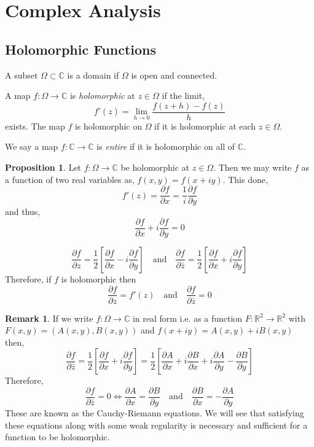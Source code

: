 \documentclass{article}
\newcommand{\R}{\mathbb{R}}
\newcommand{\C}{\mathbb{C}}
\newcommand{\pderiv}[2]{\frac{\partial{#1}}{\partial{#2}}}
\theoremstyle{definition}
\newtheorem{proposition}[theorem]{Proposition}
\newtheorem{remark}{Remark}[section]
\newenvironment{definition}[1][Definition:]{\begin{trivlist}
\item[\hskip \labelsep {\bfseries #1}]}{\end{trivlist}}
\begin{document}
\section{Complex Analysis}

\subsection{Holomorphic Functions}

\begin{definition}
A subset $\Omega \subset \C$ is a domain if $\Omega$ is open and connected.
\end{definition}

\begin{definition}
A map $f : \Omega \to \C$ is \textit{holomorphic} at $z \in \Omega$ if the limit,
\[ f'(z) = \lim_{h \to 0} \frac{ f(z + h) - f(z) }{h} \]
exists. The map $f$ is holomorphic on $\Omega$ if it is holomorphic at each $z \in \Omega$. 
\end{definition}

\begin{definition}
We say a map $f : \C \to \C$ is \textit{entire} if it is holomorphic on all of $\C$.
\end{definition}

\begin{proposition}
Let $f : \Omega \to \C$ be holomorphic at $z \in \Omega$. Then we may write $f$ as a function of two real variables as, $f(x, y) = f(x + i y)$. This done,
\[ f'(z) = \pderiv{f}{x} = \frac{1}{i} \pderiv{f}{y} \]
and thus,
\[ \pderiv{f}{x} + i \pderiv{f}{y} = 0 \] 
\end{proposition}


\begin{definition}
\[ \pderiv{f}{z} = \frac{1}{2} \left[ \pderiv{f}{x} - i \pderiv{f}{y} \right] \quad \text{and} \quad \pderiv{f}{\bar{z}} = \frac{1}{2} \left[ \pderiv{f}{x} + i \pderiv{f}{y} \right] \]
Therefore, if $f$ is holomorphic then 
\[ \pderiv{f}{z} = f'(z) \quad \text{and} \quad \pderiv{f}{\bar{z}} = 0 \]
\end{definition}


\begin{remark}
If we write $f : \Omega \to \C$ in real form i.e. as a function $F : \R^2 \to \R^2$ with $F(x,y) = (A(x,y), B(x,y))$ and $f(x + iy) = A(x,y) + i B(x,y)$ then,
\[ \pderiv{f}{\bar{z}} = \frac{1}{2} \left[ \pderiv{f}{x} + i \pderiv{f}{y} \right] = \frac{1}{2} \left[ \pderiv{A}{x} + i \pderiv{B}{x} + i \pderiv{A}{y} - \pderiv{B}{y} \right] \]
Therefore,
\[ \pderiv{f}{\bar{z}} = 0 \iff \pderiv{A}{x} = \pderiv{B}{y} \quad \text{and} \quad \pderiv{B}{x} = - \pderiv{A}{y} \]
These are known as the Cauchy-Riemann equations. We will see that satisfying these equations along with some weak regularity is necessary and sufficient for a function to be holomorphic. 
\end{remark}
\end{document}
